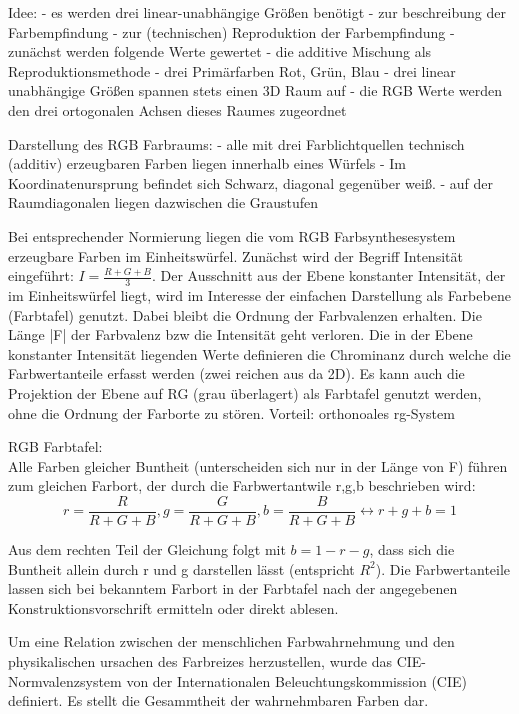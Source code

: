 \documentclass[10pt,landscape]{article}
\begin{document}
\begin{multicols}{3}
Idee:
- es werden drei linear-unabhängige Größen benötigt
  - zur beschreibung der Farbempfindung
  - zur (technischen) Reproduktion der Farbempfindung
- zunächst werden folgende Werte gewertet
  - die additive Mischung als Reproduktionsmethode
  - drei Primärfarben Rot, Grün, Blau
- drei linear unabhängige Größen spannen stets einen 3D Raum auf
  - die RGB Werte werden den drei ortogonalen Achsen dieses Raumes zugeordnet

Darstellung des RGB Farbraums:
- alle mit drei Farblichtquellen technisch (additiv) erzeugbaren Farben liegen innerhalb eines Würfels
- Im Koordinatenursprung befindet sich Schwarz, diagonal gegenüber weiß.
- auf der Raumdiagonalen liegen dazwischen die Graustufen

Bei entsprechender Normierung liegen die vom RGB Farbsynthesesystem erzeugbare Farben im Einheitswürfel. Zunächst wird der Begriff Intensität eingeführt: $I=\frac{R+G+B}{3}$. Der Ausschnitt aus der Ebene konstanter Intensität, der im Einheitswürfel liegt, wird im Interesse der einfachen Darstellung als Farbebene (Farbtafel) genutzt. Dabei bleibt die Ordnung der Farbvalenzen erhalten. Die Länge |F| der Farbvalenz bzw die Intensität geht verloren.
Die in der Ebene konstanter Intensität liegenden Werte definieren die Chrominanz durch welche die Farbwertanteile erfasst werden (zwei reichen aus da 2D). Es kann auch die Projektion der Ebene auf RG (grau überlagert) als Farbtafel genutzt werden, ohne die Ordnung der Farborte zu stören. Vorteil: orthonoales rg-System

RGB Farbtafel:\\
Alle Farben gleicher Buntheit (unterscheiden sich nur in der Länge von F) führen zum gleichen Farbort, der durch die Farbwertantwile r,g,b beschrieben wird:
$$r=\frac{R}{R+G+B}, g=\frac{G}{R+G+B}, b=\frac{B}{R+G+B} \leftrightarrow r+g+b=1$$

Aus dem rechten Teil der Gleichung folgt mit $b=1-r-g$, dass sich die Buntheit allein durch r und g darstellen lässt (entspricht $R^2$).
Die Farbwertanteile lassen sich bei bekanntem Farbort in der Farbtafel nach der angegebenen Konstruktionsvorschrift ermitteln oder direkt ablesen.


Um eine Relation zwischen der menschlichen Farbwahrnehmung und den physikalischen ursachen des Farbreizes herzustellen, wurde das CIE-Normvalenzsystem von der Internationalen Beleuchtungskommission (CIE) definiert. Es stellt die Gesammtheit der wahrnehmbaren Farben dar.


\end{multicols}
\end{document}
